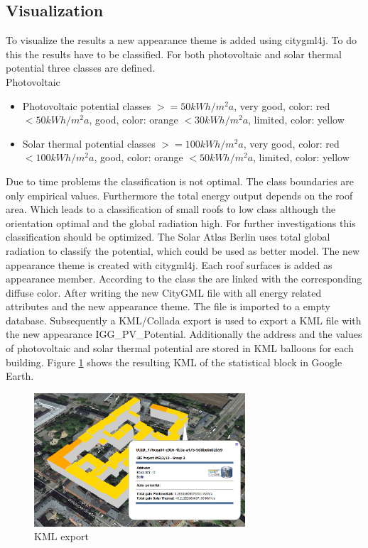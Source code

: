 \subsection{Visualization}

To visualize the results a new appearance theme is added using citygml4j. To do this the results have to be classified. For both photovoltaic and solar thermal potential three classes are defined.
\\
Photovoltaic
\begin{itemize}
\item Photovoltaic potential classes
\subitem \(>=50kWh/m^2a\), very good, color: red
\subitem \(<50kWh/m^2a\), good, color: orange
\subitem \(<30kWh/m^2a\), limited, color: yellow
\item Solar thermal potential classes
\subitem \(>=100kWh/m^2a\), very good, color: red
\subitem \(<100kWh/m^2a\), good, color: orange
\subitem \(<50kWh/m^2a\), limited, color: yellow
\end{itemize}

Due to time problems the classification is not optimal. The class boundaries are only empirical values. Furthermore the total energy output depends on the roof area. Which leads to a classification of small roofs to low class although the orientation optimal and the global radiation high. For further investigations this classification should be optimized. The Solar Atlas Berlin uses total global radiation to classify the potential, which could be used as better model.
The new appearance theme is created with citygml4j. Each roof surfaces is added as appearance member. According to the class the are linked with the corresponding diffuse color.
After writing the new CityGML file with all energy related attributes and the new appearance theme. The file is imported to a empty database. Subsequently a KML/Collada export is used to export a KML file with the new appearance IGG\_PV\_Potential. Additionally the address and the values of photovoltaic and solar thermal potential are stored in KML balloons for each building. Figure \ref{fig:vis} shows the resulting KML of the statistical block in Google Earth.

\begin{figure}[hbt!]
\centering
\includegraphics[width=0.7\textwidth]{phase2/group2/figure/viz.png}
\caption{KML export}
\label{fig:vis}
\end{figure}